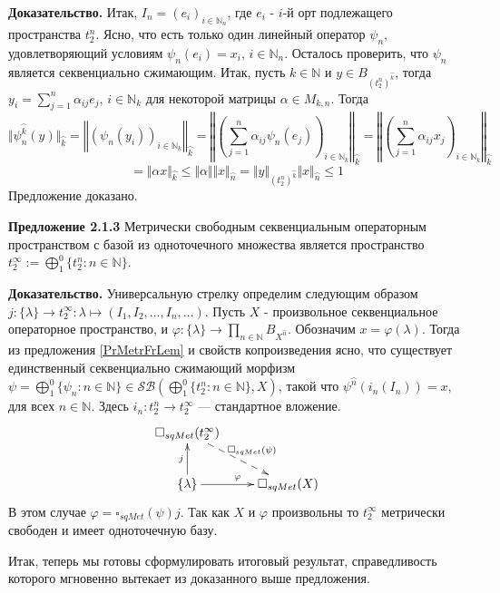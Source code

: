 \documentclass[12pt]{article}
\begin{document}
{\bf Доказательство.} Итак, $I_n = (e_i)_{i\in\mathbb{N}_n}$, где $e_i$ - $i$-й орт подлежащего пространства $t_2^n$. Ясно, что есть только один линейный оператор $\psi_n$, удовлетворяющий условиям $\psi_n(e_i) = x_i$, $i\in\mathbb{N}_n$. 
Осталось проверить, что $\psi_n$ является секвенциально сжимающим. Итак, пусть $k \in \mathbb{N}$ и $y \in B_{(t_2^n)^{\wideparen{k}}} $, тогда $y_i = \sum\limits_{j = 1}^n \alpha_{ij}e_j$, $i\in\mathbb{N}_k$ 
для некоторой матрицы $\alpha\in M_{k,n}$. Тогда 
$$
\Vert\psi_n^{\wideparen{k}}(y)\Vert_{\wideparen{k}}
=\left\Vert\left(\psi_n(y_i)\right)_{i\in\mathbb{N}_k}\right\Vert_{\wideparen{k}}
=\left\Vert\left(\sum\limits_{j=1}^n\alpha_{ij}\psi_n(e_j)\right)_{i\in\mathbb{N}_k}\right\Vert_{\wideparen{k}}
=\left\Vert\left(\sum\limits_{j=1}^n\alpha_{ij}x_j\right)_{i\in\mathbb{N}_k}\right\Vert_{\wideparen{k}}
$$
$$
=\Vert\alpha x\Vert_{\wideparen{k}}
\leq\Vert\alpha\Vert\Vert x\Vert_{\wideparen{n}}
=\Vert y\Vert_{(t_2^n)^{\wideparen{k}}}\Vert x\Vert_{\wideparen{n}}\leq 1
$$
Предложение доказано.

\medskip

{\bf Предложение 2.1.3} Метрически свободным секвенциальным операторным пространством с базой из одноточечного множества является пространство $t_2^{\infty} := \bigoplus_1^0 \{t_2^n: n \in \mathbb{N}\}$.

{\bf Доказательство.} Универсальную стрелку определим следующим образом $j:\{\lambda\}\to t_2^\infty:\lambda\mapsto(I_1,I_2,\ldots,I_n,\ldots)$. Пусть $X$ - произвольное секвенциальное операторное пространство, и 
$\varphi:\{\lambda\}\to \prod_{n \in \mathbb{N}} B_{X^{\wideparen{n}}}$. Обозначим $x=\varphi(\lambda)$. Тогда из предложения \ref{PrMetrFrLem} и свойств копроизведения ясно, что существует 
единственный секвенциально сжимающий морфизм $\psi=\bigoplus_1^0\{\psi_n:n\in\mathbb{N}\}\in\mathcal{SB}\left(\bigoplus_1^0\{ t_2^n:n\in\mathbb{N}\}, X\right)$, такой что $\psi^{\wideparen{n}}(i_n(I_n)) = x$, 
для всех $n \in \mathbb{N}$. Здесь $i_n:t_2^n\to t_2^\infty$ --- стандартное вложение.
$$
\xymatrix{
{\square_{sqMet} (t_2^\infty)} \ar@{-->}[dr]^{\square_{sqMet} (\psi)} & \\
{\{\lambda\}} \ar[u]^{j} \ar[r]^{\varphi} &{\square_{sqMet} (X)}}
$$
В этом случае $\varphi=\square_{sqMet}(\psi) j$. Так как $X$ и $\varphi$ произвольны то $t_2^\infty$ метрически свободен и имеет одноточечную базу. 

\medskip

Итак, теперь мы готовы сформулировать итоговый результат, справедливость которого мгновенно вытекает из доказанного выше предложения.
\end{document}
